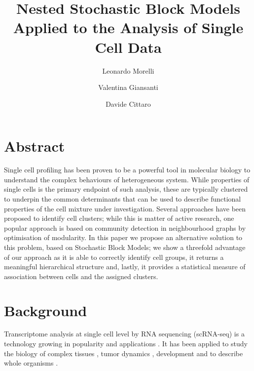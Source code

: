 \documentclass[10pt]{article}
\begin{document}
\title{Nested Stochastic Block Models Applied to the Analysis of Single Cell Data}
\author[1,2]{Leonardo Morelli}
\author[1,3]{Valentina Giansanti}
\author[1]{Davide Cittaro}
\maketitle

\section*{Abstract}

Single cell profiling has been proven to be a powerful tool in molecular biology to understand the complex behaviours of heterogeneous system. While properties of single cells is the primary endpoint of such analysis, these are typically clustered to underpin the common determinants that can be used to describe functional properties of the cell mixture under investigation. Several approaches have been proposed to identify cell clusters; while this is matter of active research, one popular approach is based on community detection in neighbourhood graphs by optimisation of modularity. In this paper we propose an alternative solution to this problem, based on Stochastic Block Models; we show a threefold advantage of our approach as it is able to correctly identify cell groups, it returns a meaningful hierarchical structure and, lastly, it provides a statistical measure of association between cells and the assigned clusters.


\section*{Background}

Transcriptome analysis at single cell level by RNA sequencing (scRNA-seq) is a technology growing in popularity and applications \cite{svensson_2018}. It has been applied to study the biology of complex tissues \cite{guo_2018, ventotormo_2018}, tumor dynamics \cite{rozenblattrosen_2020, tirosh_2016, patel_2014, neftel_2019}, development \cite{rosenberg_2018, wagner_2018} and to describe whole organisms \cite{plass_2018, regev_2017}.
\end{document}
